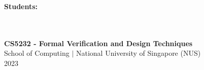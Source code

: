 \begin{titlepage}
\begin{flushleft}
        \begin{spacing}{1.5}
            \large \textbf{Students:}\\
            \\
            \\
        \end{spacing}

        \vspace{1cm}
            
        \vspace{0.3cm}
            
            
        \Large
        \textbf{CS5232 - Formal Verification and Design Techniques}\\
        School of Computing $\vert$ National University of Singapore (NUS)\\
        2023
            
    \end{flushleft}
\end{titlepage}